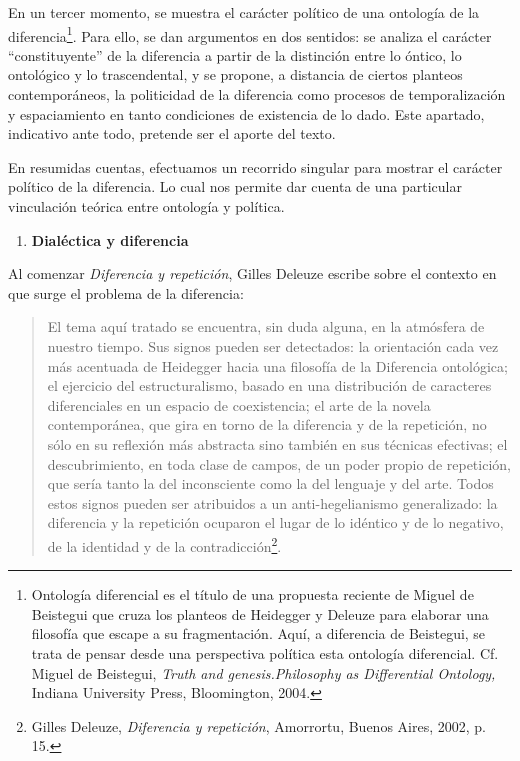 \documentclass{book}
\begin{document}
En un tercer momento, se muestra el carácter político de una ontología
de la diferencia\footnote{Ontología diferencial es el título de una
  propuesta reciente de Miguel de Beistegui que cruza los planteos de
  Heidegger y Deleuze para elaborar una filosofía que escape a su
  fragmentación. Aquí, a diferencia de Beistegui, se trata de pensar
  desde una perspectiva política esta ontología diferencial. Cf. Miguel
  de Beistegui, \emph{Truth and genesis.Philosophy as Differential
  Ontology,} Indiana University Press, Bloomington, 2004.}. Para ello,
se dan argumentos en dos sentidos: se analiza el carácter
\enquote{constituyente} de la diferencia a partir de la distinción entre lo
óntico, lo ontológico y lo trascendental, y se propone, a distancia de
ciertos planteos contemporáneos, la politicidad de la diferencia como
procesos de temporalización y espaciamiento en tanto condiciones de
existencia de lo dado. Este apartado, indicativo ante todo, pretende ser
el aporte del texto.

En resumidas cuentas, efectuamos un recorrido singular para mostrar el
carácter político de la diferencia. Lo cual nos permite dar cuenta de
una particular vinculación teórica entre ontología y política.

\begin{enumerate}
\def\labelenumi{\arabic{enumi}.}
\setcounter{enumi}{1}
\item
  \textbf{Dialéctica y diferencia}
\end{enumerate}

Al comenzar \emph{Diferencia y repetición}, Gilles Deleuze escribe sobre
el contexto en que surge el problema de la diferencia:

\begin{quote}
El tema aquí tratado se encuentra, sin duda alguna, en la atmósfera de
nuestro tiempo. Sus signos pueden ser detectados: la orientación cada
vez más acentuada de Heidegger hacia una filosofía de la Diferencia
ontológica; el ejercicio del estructuralismo, basado en una distribución
de caracteres diferenciales en un espacio de coexistencia; el arte de la
novela contemporánea, que gira en torno de la diferencia y de la
repetición, no sólo en su reflexión más abstracta sino también en sus
técnicas efectivas; el descubrimiento, en toda clase de campos, de un
poder propio de repetición, que sería tanto la del inconsciente como la
del lenguaje y del arte. Todos estos signos pueden ser atribuidos a un
anti-hegelianismo generalizado: la diferencia y la repetición ocuparon
el lugar de lo idéntico y de lo negativo, de la identidad y de la
contradicción\footnote{Gilles Deleuze, \emph{Diferencia y repetición},
  Amorrortu, Buenos Aires, 2002, p. 15.}.
\end{quote}
\end{document}
